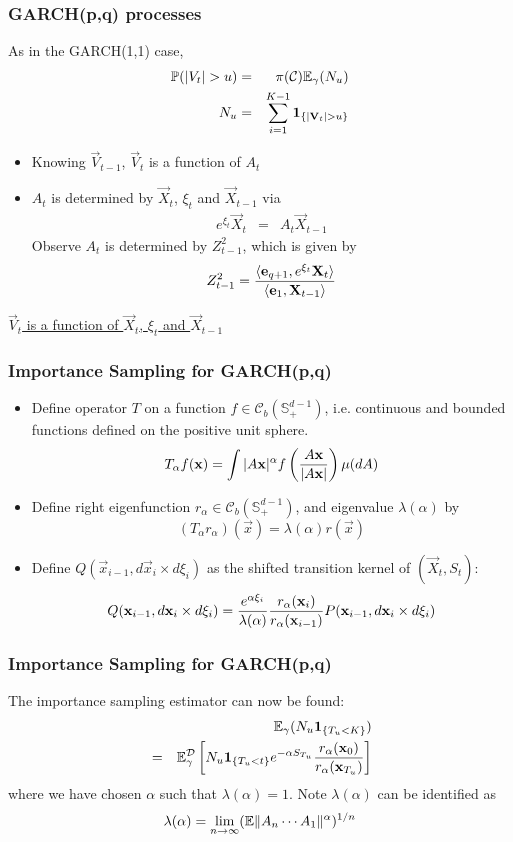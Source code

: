 \documentclass{beamer}
\begin{document}
\begin{frame}
  \frametitle{GARCH(p,q) processes}
  As in the GARCH(1,1) case,
  \begin{eqnarray*}
    \P(|V_t| > u) &=& \pi(\mathcal C) \E_\gamma(N_u) \\
    N_u &=& \sum_{i=1}^{K-1} \1{|\vec V_t| > u}
  \end{eqnarray*}
  \begin{itemize}
  \item Knowing $\vec V_{t-1}$, $\vec V_t$ is a function of $A_t$
  \item $A_t$ is determined by $\vec X_t$, $\xi_t$ and $\vec X_{t-1}$ via
    \begin{eqnarray*}
      e^{\xi_t} \vec X_t &=& A_t \vec X_{t-1}
    \end{eqnarray*}
    Observe $A_t$ is determined by $Z_{t-1}^2$, which is given by
    \[
    Z_{t-1}^2 = {
      \inn{\vec e_{q+1}, e^{\xi_t} \vec X_{t}}
      \over
      \inn{\vec e_{1}, \vec X_{t-1}}
    }
    \]
  \end{itemize}
  \underline{$\vec V_t$ is a function of $\vec X_t$, $\xi_t$ and $\vec X_{t-1}$}
\end{frame}

\begin{frame}
  \frametitle{Importance Sampling for GARCH(p,q)}
  \begin{itemize}
  \item Define operator $T$ on a function $f \in \mathscr C_b(\mathbb
    S^{d-1}_+)$, i.e. continuous and bounded functions defined on the
    positive unit sphere.
    \[
    T_\alpha f(\vec x) = \int |A \vec x|^\alpha
    f\left({A \vec x \over |A \vec x|}\right) \mu(dA)
    \]
  \item Define right eigenfunction $r_\alpha \in \mathscr C_b(\mathbb
    S^{d-1}_+)$, and eigenvalue $\lambda(\alpha)$ by
    \[
    (T_\alpha r_\alpha)(\vec x) = \lambda(\alpha) r(\vec x)
    \]
  \item Define $Q(\vec x_{i-1}, d\vec x_{i} \times d\xi_{i})$ as the
    shifted transition kernel of $(\vec X_t, S_t)$:
    \[
    Q(\vec x_{i-1}, d\vec x_{i} \times d\xi_{i})
    =
    {e^{\alpha \xi_i} \over \lambda(\alpha) }
    {r_\alpha(\vec x_i) \over r_\alpha(\vec x_{i-1})}
    P(\vec x_{i-1}, d\vec x_{i} \times d\xi_{i})
    \]
  \end{itemize}
\end{frame}

\begin{frame}
  \frametitle{Importance Sampling for GARCH(p,q)}
  The importance sampling estimator can now be found:
    \begin{eqnarray*}
      && \E_\gamma (N_u \1{T_u < K}) \\
      &=& \E_\gamma^{\mathcal D} \left[
      N_u \1{T_u < t} e^{-\alpha S_{T_u}}
      {r_\alpha(\vec x_{0}) \over r_\alpha(\vec x_{T_u})}
    \right]
    \end{eqnarray*}
    where we have chosen $\alpha$ such that $\lambda(\alpha) = 1$.
    Note $\lambda(\alpha)$ can be identified as
    \[
    \lambda(\alpha) = \lim_{n \to \infty} (\E \|A_n \cdots A_1\|^\alpha)^{1/n}
    \]
\end{frame}
\end{document}
